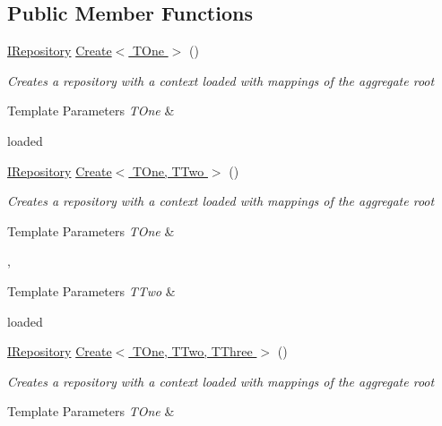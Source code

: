 \subsection*{Public Member Functions}
\begin{DoxyCompactItemize}
\item 
\hyperlink{interface_highway_1_1_data_1_1_interfaces_1_1_i_repository}{I\-Repository} \hyperlink{interface_highway_1_1_data_1_1_interfaces_1_1_i_repository_factory_a343d7436f44181174c5a213ae59f4588}{Create$<$ T\-One $>$} ()
\begin{DoxyCompactList}\small\item\em Creates a repository with a context loaded with mappings of the aggregate root 
\begin{DoxyTemplParams}{Template Parameters}
{\em T\-One} & \\
\hline
\end{DoxyTemplParams}
loaded \end{DoxyCompactList}\item 
\hyperlink{interface_highway_1_1_data_1_1_interfaces_1_1_i_repository}{I\-Repository} \hyperlink{interface_highway_1_1_data_1_1_interfaces_1_1_i_repository_factory_af84ae4a3ffcb355f70c9ab332b27fa75}{Create$<$ T\-One, T\-Two $>$} ()
\begin{DoxyCompactList}\small\item\em Creates a repository with a context loaded with mappings of the aggregate root 
\begin{DoxyTemplParams}{Template Parameters}
{\em T\-One} & \\
\hline
\end{DoxyTemplParams}
,
\begin{DoxyTemplParams}{Template Parameters}
{\em T\-Two} & \\
\hline
\end{DoxyTemplParams}
loaded \end{DoxyCompactList}\item 
\hyperlink{interface_highway_1_1_data_1_1_interfaces_1_1_i_repository}{I\-Repository} \hyperlink{interface_highway_1_1_data_1_1_interfaces_1_1_i_repository_factory_a52f84ef3732b1f34558d928e02f0f7c4}{Create$<$ T\-One, T\-Two, T\-Three $>$} ()
\begin{DoxyCompactList}\small\item\em Creates a repository with a context loaded with mappings of the aggregate root 
\begin{DoxyTemplParams}{Template Parameters}
{\em T\-One} & \\

\end{DoxyTemplParams}
\end{DoxyCompactList}
\end{DoxyCompactItemize}
